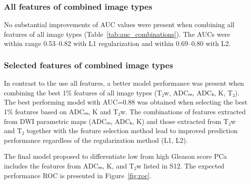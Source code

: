 \subsubsection{All features of combined image types}

No substantial improvements of AUC values were present when combining all
features of all image types (Table~\ref{tab:auc_combinations}). The AUCs were
within range 0.53--0.82 with L1 regularization and within 0.69--0.80 with L2.


\subsubsection{Selected features of combined image types}

In contrast to the use all features, a better model performance was present when
combining the best 1\% features of all image types (T₂w, ADCₘ, ADCₖ, K,
T₂). The best performing model with AUC=0.88 was obtained when selecting the
best 1\% features based on ADCₘ, K and T₂w. The combinations of features
extracted from DWI parametric maps (ADCₘ, ADCₖ, K) and those extracted from T₂w
and T₂ together with the feature selection method lead to improved prediction
performance regardless of the regularization method (L1, L2).

The final model proposed to differentiate low from high Gleason score PCa
includes the features from ADCₘ, K, and T₂w listed in S12. The expected
performance ROC is presented in Figure~\ref{fig:roc}.
